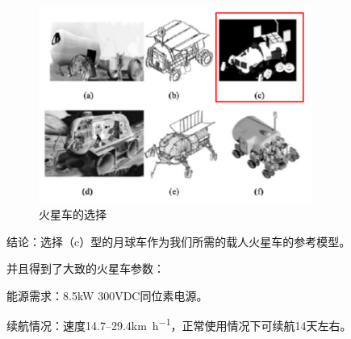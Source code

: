 \begin{figure}[H]
  \label{chp:activity:end}
  \centering
  \includegraphics[width=0.8\textwidth]{figure/variety-cart.png}
  \caption{火星车的选择}
\end{figure}

结论：选择（c）型的月球车作为我们所需的载人火星车的参考模型。

并且得到了大致的火星车参数：

能源需求：8.5\si{\kilo\watt} 300\si{\volt}DC同位素电源。

续航情况：速度14.7--29.4\si{\kilo\metre\per\hour}，正常使用情况下可续航14天左右。
